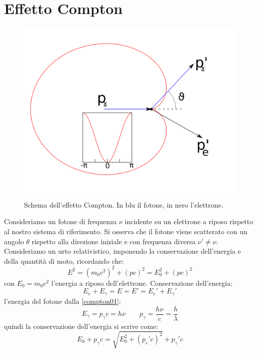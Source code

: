 \section{Effetto Compton}
\begin{figure}[htbp]
 \centering
 \includegraphics[scale=0.5]{immagini/fisica3/compton}
 \caption{Schema dell'effetto Compton. In blu il fotone, in nero l'elettrone.}
 \label{fig:compton}
\end{figure}
Consideriamo un fotone di frequenza $\nu$ incidente su un elettrone a riposo rispetto al nostro sistema di riferimento. Si osserva che il fotone viene scatterato con un angolo $\theta$ rispetto alla direzione iniziale e con frequenza diversa $\nu'\neq\nu$. Consideriamo un urto relativistico, imponendo la conservazione dell'energia e della quantità di moto, ricordando che:
\begin{equation}
E^2=(m_0c^2)^2+(pc)^2=E_0^2+(pc)^2
\label{compton01}
\end{equation}
con $E_0=m_0c^2$ l'energia a riposo dell'elettrone. Conservazione dell'energia:
\begin{equation}
E_{e}+E_{\gamma}=E=E'=E_e'+E_{\gamma}'
\end{equation}
l'energia del fotone dalla \eqref{compton01}:
\begin{equation}
E_{\gamma}=p_\gamma c=h\nu\qquad p_\gamma=\frac{h\nu}{c}=\frac{h}{\lambda}
\end{equation}
quindi la conservazione dell'energia si scrive come:
\begin{equation}
E_{0}+p_\gamma c=\sqrt{E_0^2+(p_e' c)^2}+p_\gamma'c
\end{equation}
